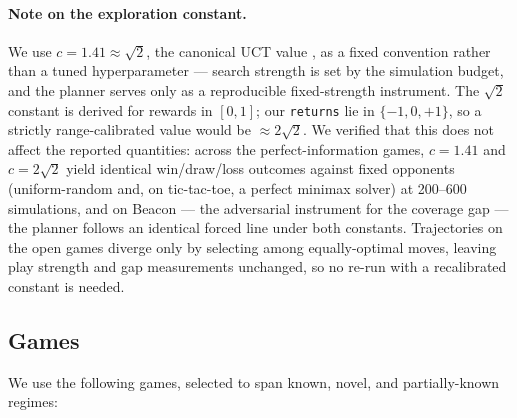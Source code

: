 \documentclass[11pt]{article}
\theoremstyle{remark}
\begin{document}
\paragraph{Note on the exploration constant.} We use $c = 1.41 \approx \sqrt{2}$, the canonical UCT value \citep{kocsis2006bandit}, as a fixed convention rather than a tuned hyperparameter --- search strength is set by the simulation budget, and the planner serves only as a reproducible fixed-strength instrument. The $\sqrt{2}$ constant is derived for rewards in $[0, 1]$; our \texttt{returns} lie in $\{-1, 0, +1\}$, so a strictly range-calibrated value would be $\approx 2\sqrt{2}$. We verified that this does not affect the reported quantities: across the perfect-information games, $c = 1.41$ and $c = 2\sqrt{2}$ yield identical win/draw/loss outcomes against fixed opponents (uniform-random and, on tic-tac-toe, a perfect minimax solver) at 200--600 simulations, and on Beacon --- the adversarial instrument for the coverage gap --- the planner follows an identical forced line under both constants. Trajectories on the open games diverge only by selecting among equally-optimal moves, leaving play strength and gap measurements unchanged, so no re-run with a recalibrated constant is needed.

\subsection{Games}
\label{sec:games}

We use the following games, selected to span known, novel, and partially-known regimes:
\end{document}
